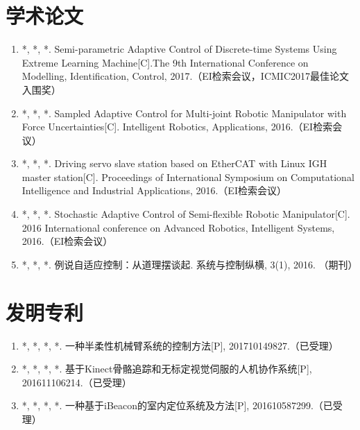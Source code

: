 
\begin{publications}{99}
\section*{学术论文}
\begin{enumerate}%
\item *, *, *. Semi-parametric Adaptive Control of Discrete-time Systems Using Extreme Learning Machine[C].The 9th International Conference on Modelling, Identification, Control, 2017.（EI检索会议，ICMIC2017最佳论文入围奖）
\item *, *, *. Sampled Adaptive Control for Multi-joint Robotic Manipulator with Force Uncertainties[C]. Intelligent Robotics, Applications, 2016.（EI检索会议）
\item *, *, *. Driving servo slave station based on EtherCAT with Linux IGH master station[C]. Proceedings of International Symposium on Computational Intelligence and Industrial Applications, 2016.（EI检索会议）
\item *, *, *. Stochastic Adaptive Control of Semi-flexible Robotic Manipulator[C]. 2016 International conference on Advanced Robotics, Intelligent Systems, 2016.（EI检索会议）
\item *, *, *. 例说自适应控制：从道理摆谈起. 系统与控制纵横, 3(1), 2016. （期刊）
\end{enumerate}

\section*{发明专利}
\begin{enumerate}%
\item *, *, *, *. 一种半柔性机械臂系统的控制方法[P], 201710149827.（已受理）
\item *, *, *, *. 基于Kinect骨骼追踪和无标定视觉伺服的人机协作系统[P], 201611106214.（已受理）
\item *, *, *, *. 一种基于iBeacon的室内定位系统及方法[P], 201610587299.（已受理）
\end{enumerate}


\end{publications}

